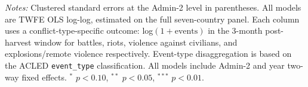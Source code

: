 \par \raggedright 
\textit{Notes:} Clustered standard errors at the Admin-2 level in parentheses. All models are TWFE OLS log-log, estimated on the full seven-country panel. Each column uses a conflict-type-specific outcome: log$(1+\text{events})$ in the 3-month post-harvest window for battles, riots, violence against civilians, and explosions/remote violence respectively. Event-type disaggregation is based on the ACLED \texttt{event\_type} classification. All models include Admin-2 and year two-way fixed effects. $^{*}$ $p<0.10$, $^{**}$ $p<0.05$, $^{***}$ $p<0.01$.
\par\endgroup


